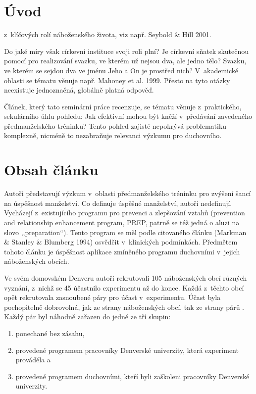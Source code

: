 \chapter{Úvod}
\label{kap:uvod}

z~klíčových rolí náboženského života, viz např. Seybold \& Hill
2001\cite{seybold2001role}.

Do jaké míry však církevní instituce svoji roli plní? Je církevní sňatek
skutečnou pomocí pro realizování svazku, ve kterém už nejsou dva, ale jedno
tělo? Svazku, ve kterém se sejdou dva ve jménu Jeho a On je prostřed nich?
V~akademické oblasti se tématu věnuje např. Mahoney et al.
1999\cite{mahoney1999marriage}.  Přesto na tyto otázky neexistuje jednoznačná,
globálně platná odpověď. 

Článek, který tato seminární práce recenzuje, se tématu věnuje z~praktického,
sekulárního úhlu pohledu: Jak efektivní mohou být kněží v~předávání zavedeného
předmanželského tréninku? Tento pohled zajisté nepokrývá problematiku komplexně,
nicméně to nezabraňuje relevanci výzkumu pro duchovního.

\vspace{15mm}
\chapter{Obsah článku}

Autoři představují výzkum v~oblasti předmanželského tréninku pro zvýšení šancí
na úspěšnost manželství\cite{stanley2001community}. Co definuje úspěšné
manželství, autoři nedefinují.  Vycházejí z~existujícího programu pro prevenci a
zlepšování vztahů (prevention and relationship enhancement program, PREP, patrně
se též jedná o aluzi na slovo ,,preparation``). Tento program se měl podle
citovaného článku (Markman \& Stanley \& Blumberg
1994\cite{markman1994fighting}) osvědčit v~klinických podmínkách.  Předmětem
tohoto článku je úspěšnost aplikace zmíněného programu duchovními v~jejich
náboženských obcích.

Ve svém domovském Denveru autoři rekrutovali 105 náboženských obcí různých
vyznání, z~nichž se 45 účastnilo experimentu až do konce. Každá z~těchto obcí
opět rekrutovala zasnoubené páry pro účast v~experimentu. Účast byla
pochopitelně dobrovolná, jak ze strany náboženských obcí, tak ze strany párů%
. Každý
pár byl náhodně zařazen do jedné ze tří skupin:
\begin{enumerate}
  \item{ponechané bez zásahu,}
  \item{
    provedené programem pracovníky Denverské univerzity, která experiment
    prováděla a
  }
  \item{
    provedené programem duchovními, kteří byli zaškoleni pracovníky Denverské
    univerzity.
  }
\end{enumerate}

